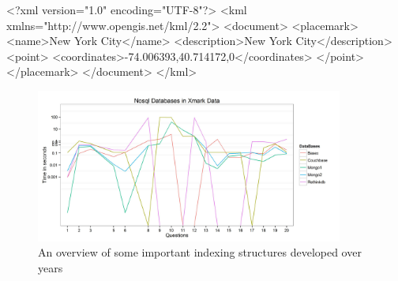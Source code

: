 
\begin{fakeXML}[label=kml,caption=A simple KML example representing a Point]
<?xml version="1.0" encoding="UTF-8"?>
<kml xmlns="http://www.opengis.net/kml/2.2">
<document>
<placemark>
  <name>New York City</name>
  <description>New York City</description>
  <point>
    <coordinates>-74.006393,40.714172,0</coordinates>
  </point>
</placemark>
</document>
</kml>
\end{fakeXML} 

\begin{fakeJSON}[label=xml,caption=JSON Data]
\end{fakeJSON} 
\begin{figure}
	\centering
	\includegraphics[width=0.9\textwidth]{img/Plot7}
	\caption{An overview of some important indexing structures developed over years}
	\label{trees}
\end{figure}

